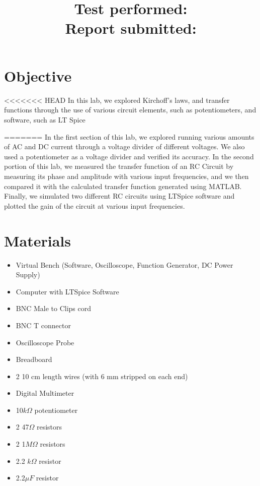 \documentclass[10pt]{article}
\title{
    \textbf{\courseTitle} \\
    \textbf{\documentTitle} \\
    \bigskip
    \textbf{\large{Test performed: \testDate}} \\
    \textbf{\large{Report submitted: \reportDate}} \\
    \bigskip
    \bigskip
}
\author{\documentAuthor}
\date{}
\begin{document}
\maketitle

\newpage

\section{Objective}

<<<<<<< HEAD
In this lab, we explored Kirchoff's laws, and transfer functions through the use of various circuit elements, such as potentiometers, and software, such as LT Spice

\medskip
=======
In the first section of this lab, we explored running various amounts of AC and DC current through a voltage divider of different voltages. We also used a potentiometer as a voltage divider and verified its accuracy. In the second portion of this lab, we measured the transfer function of an RC Circuit by measuring its phase and amplitude with various input frequencies, and we then compared it with the calculated transfer function generated using MATLAB. Finally, we simulated two different RC circuits using LTSpice software and plotted the gain of the circuit at various input frequencies. 




\section{Materials}

\begin{itemize}
	\item Virtual Bench (Software, Oscilloscope, Function Generator, DC Power Supply)
	\item Computer with LTSpice Software 
	\item BNC Male to Clips cord
	\item BNC T connector
	\item Oscilloscope Probe
	\item Breadboard
	\item 2 10 cm length wires (with 6 mm stripped on each end)
	\item Digital Multimeter
	\item 10$k\Omega$ potentiometer
	\item 2 47$\Omega$ resistors
	\item 2 1$M\Omega$ resistors
	\item 2.2 $k\Omega$ resistor
	\item 2.2$\mu F$ resistor
	
\end{itemize}
\end{document}
